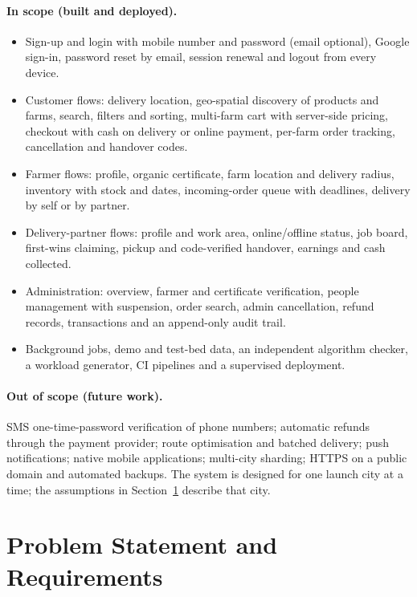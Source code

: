 \documentclass[manuscript,screen,review]{acmart}
\begin{document}
\paragraph{In scope (built and deployed).}
\begin{itemize}
  \item Sign-up and login with mobile number and password (email optional), Google sign-in, password reset by email, session renewal and logout from every device.
  \item Customer flows: delivery location, geo-spatial discovery of products and farms, search, filters and sorting, multi-farm cart with server-side pricing, checkout with cash on delivery or online payment, per-farm order tracking, cancellation and handover codes.
  \item Farmer flows: profile, organic certificate, farm location and delivery radius, inventory with stock and dates, incoming-order queue with deadlines, delivery by self or by partner.
  \item Delivery-partner flows: profile and work area, online/offline status, job board, first-wins claiming, pickup and code-verified handover, earnings and cash collected.
  \item Administration: overview, farmer and certificate verification, people management with suspension, order search, admin cancellation, refund records, transactions and an append-only audit trail.
  \item Background jobs, demo and test-bed data, an independent algorithm checker, a workload generator, CI pipelines and a supervised deployment.
\end{itemize}

\paragraph{Out of scope (future work).} SMS one-time-password verification of phone numbers; automatic refunds through the payment provider; route optimisation and batched delivery; push notifications; native mobile applications; multi-city sharding; HTTPS on a public domain and automated backups. The system is designed for one launch city at a time; the assumptions in Section~\ref{sec:requirements} describe that city.

\section{Problem Statement and Requirements}
\label{sec:requirements}
\end{document}
